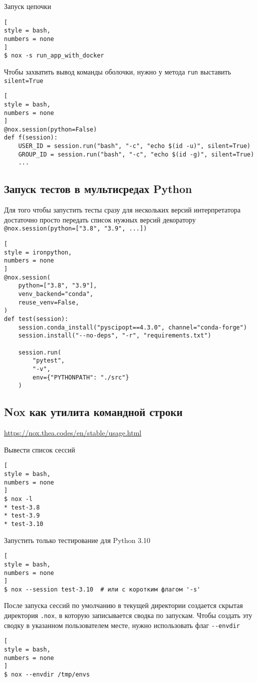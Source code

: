 \documentclass[%
	11pt,
	a4paper,
	utf8,
		]{article}
\begin{document}
Запуск цепочки
\begin{lstlisting}[
style = bash,
numbers = none
]
$ nox -s run_app_with_docker
\end{lstlisting}

Чтобы захватить вывод команды оболочки, нужно у метода \verb|run| выставить \verb|silent=True|
\begin{lstlisting}[
style = bash,
numbers = none
]
@nox.session(python=False)
def f(session):
	USER_ID = session.run("bash", "-c", "echo $(id -u)", silent=True)
	GROUP_ID = session.run("bash", "-c", "echo $(id -g)", silent=True)
	...
\end{lstlisting}

\subsection{Запуск тестов в мультисредах Python}

Для того чтобы запустить тесты сразу для нескольких версий интерпретатора достаточно просто передать список нужных версий декоратору \verb|@nox.session(python=["3.8", "3.9", ...])|
\begin{lstlisting}[
style = ironpython,
numbers = none
]
@nox.session(
    python=["3.8", "3.9"],
    venv_backend="conda",
    reuse_venv=False,
)
def test(session):
    session.conda_install("pyscipopt==4.3.0", channel="conda-forge")
    session.install("--no-deps", "-r", "requirements.txt")
    
    session.run(
        "pytest",
        "-v",
        env={"PYTHONPATH": "./src"}
    )
\end{lstlisting}

\subsection{Nox как утилита командной строки}

\url{https://nox.thea.codes/en/stable/usage.html}

Вывести список сессий
\begin{lstlisting}[
style = bash,
numbers = none
]
$ nox -l
* test-3.8
* test-3.9
* test-3.10
\end{lstlisting}

Запустить только тестирование для Python 3.10
\begin{lstlisting}[
style = bash,
numbers = none
]
$ nox --session test-3.10  # или с коротким флагом '-s'
\end{lstlisting}

После запуска сессий по умолчанию в текущей директории создается скрытая директория \verb|.nox|, в которую записывается сводка по запускам. Чтобы создать эту сводку в указанном пользователем месте, нужно использовать флаг \verb|--envdir|
\begin{lstlisting}[
style = bash,
numbers = none
]
$ nox --envdir /tmp/envs
\end{lstlisting}
\end{document}
